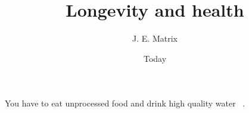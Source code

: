 \documentclass{article}
\begin{document}
\title{Longevity and health}
\author{J. E. Matrix}
\date{Today}
\maketitle

You have to eat unprocessed food and drink high quality water 
~\autocite[1]{firstbib}.
\end{document}
